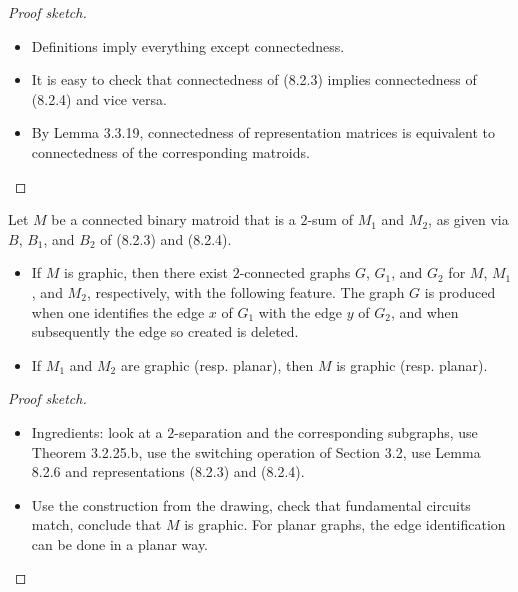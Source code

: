 \begin{proof}[Proof sketch]
  \begin{itemize}
    \item Definitions imply everything except connectedness.
    \item It is easy to check that connectedness of (8.2.3) implies connectedness of (8.2.4) and vice versa.
    \item By Lemma 3.3.19, connectedness of representation matrices is equivalent to connectedness of the corresponding matroids.
  \end{itemize}
\end{proof}

\begin{lemma}[8.2.7]
  \label{lem:8.2.7}
  Let $M$ be a connected binary matroid that is a $2$-sum of $M_{1}$ and $M_{2}$, as given via $B$, $B_1$, and $B_2$ of (8.2.3) and (8.2.4).
  \begin{itemize}
    \item If $M$ is graphic, then there exist $2$-connected graphs $G$, $G_{1}$, and $G_{2}$ for $M$, $M_{1}$, and $M_{2}$, respectively, with the following feature. The graph $G$ is produced when one identifies the edge $x$ of $G_{1}$ with the edge $y$ of $G_{2}$, and when subsequently the edge so created is deleted.
    \item If $M_{1}$ and $M_{2}$ are graphic (resp. planar), then $M$ is graphic (resp. planar).
  \end{itemize}
\end{lemma}

\begin{proof}[Proof sketch]
  \begin{itemize}
    \item Ingredients: look at a $2$-separation and the corresponding subgraphs, use Theorem 3.2.25.b, use the switching operation of Section 3.2, use Lemma 8.2.6 and representations (8.2.3) and (8.2.4).
    \item Use the construction from the drawing, check that fundamental circuits match, conclude that $M$ is graphic. For planar graphs, the edge identification can be done in a planar way.
  \end{itemize}
\end{proof}


